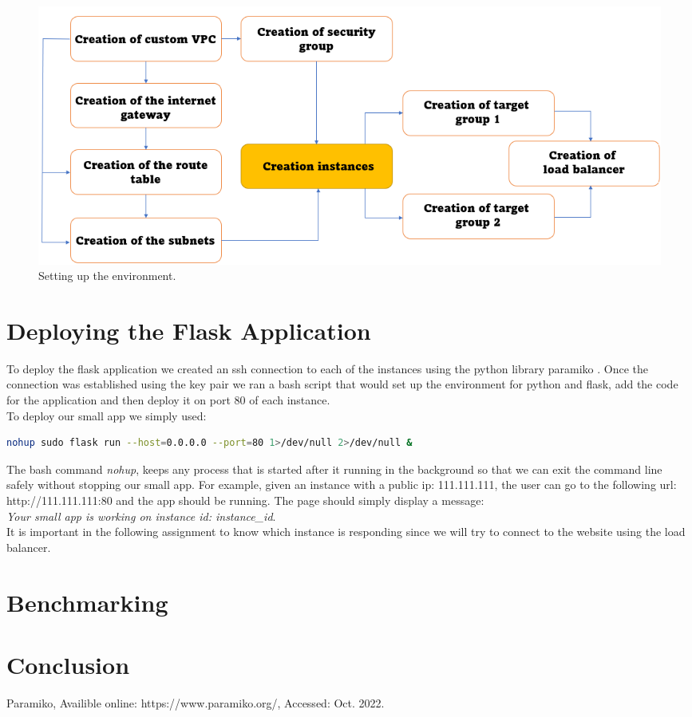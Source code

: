\documentclass[12pt]{article}
\begin{document}
\begin{figure}[h]
  \includegraphics[width=\linewidth]{Environment_setup.png}
  \caption{Setting up the environment.}
  \label{fig:boat1}
\end{figure}

\section{Deploying the Flask Application}
To deploy the flask application we created an ssh connection to each of the instances using the python library paramiko \cite{paramiko}. 
Once the connection was established using the key pair we ran a bash script that would set up the environment for python and flask, add the code for the application and then deploy it on port 80 of each instance. 
\\
To deploy our small app we simply used:
\begin{lstlisting}[language=Bash]
nohup sudo flask run --host=0.0.0.0 --port=80 1>/dev/null 2>/dev/null &
\end{lstlisting}
The bash command \emph{nohup}, keeps any process that is started after it running in the background so that we can exit the command line safely without stopping our small app. For example, given an instance with a public ip: 111.111.111, the user can go to the following url: http://111.111.111:80 and the app should be running. The page should simply display a message: \\
\emph{Your small app is working on instance id: instance\_id}.\\ It is important in the following assignment to know which instance is responding since we will try to connect to the website using the load balancer. 

\section{Benchmarking}
\section{Conclusion}

\begin{thebibliography}{9}
Paramiko, Availible online: https://www.paramiko.org/, Accessed: Oct. 2022. 
\end{thebibliography}
\end{document}
